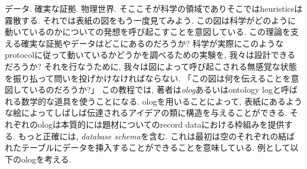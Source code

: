 データ. 確実な証拠. 物理世界. そここそが科学の領域でありそこではheuristicsは霧散する. それでは表紙の図をもう一度見てみよう. 
この図は科学がどのように動いているのかについての発想を呼び起こすことを意図している. この理論を支える確実な証拠やデータはどこにあるのだろうか? 科学が実際にこのようなprotocolに従って動いているかどうかを調べるための実験を, 我々は設計できるだろうか? それを行なうために, 我々は図によって呼び起こされる無感覚な状態を振り払って問いを投げかけなければならない. 「この図は何を伝えることを意図しているのだろうか?」
この教程では, 著者は\emph{olog}あるいはontology logと呼ばれる数学的な道具を使うことになる. ologを用いることによって, 表紙にあるような絵によってしばしば伝達されるアイデアの類に構造を与えることができる. それぞれのologは本質的には題材についてのrecord dataにおける枠組みを提供する. もっと正確には, \emph{database schema}を含む. これは最初は空のそれぞれの結ばれたテーブルにデータを挿入することができることを意味している. 例として以下のologを考える.
